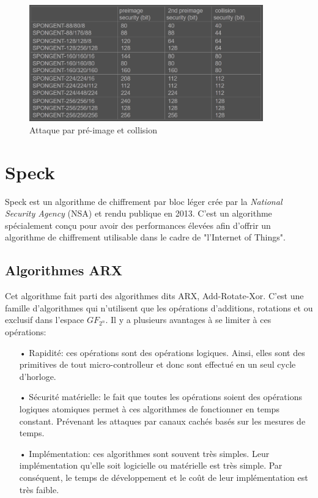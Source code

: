 		\begin{figure}[!h]
			\centering
			\includegraphics[width=0.9\textwidth, height=0.3\textheight]{imgs/Spongent/attaquePreImage.png}
			\caption{Attaque par pré-image et collision}
			\label{attaquePreImage}
		\end{figure}

		\section{Speck}

			Speck est un algorithme de chiffrement par bloc léger crée par la
		\textit{National Security Agency} (NSA) et rendu
		publique en 2013. C'est un algorithme spécialement conçu pour avoir des performances
		élevées afin d'offrir un algorithme de chiffrement utilisable dans le cadre de
		"l'Internet of Things".

		\subsection{Algorithmes ARX}

				Cet algorithme fait parti des algorithmes dits ARX, Add-Rotate-Xor. C'est une famille
			d'algorithmes qui n'utilisent que les opérations d'additions, rotations et ou exclusif
			dans l'espace $GF_{2^n}$. Il y a plusieurs avantages à se limiter à ces opérations:

			\begin{enumerate}
			\item[•] Rapidité: ces opérations sont des opérations logiques. Ainsi, elles sont
				des primitives de tout micro-controlleur et donc sont effectué en un seul
				cycle d'horloge.
			\item[•] Sécurité matérielle: le fait que toutes les opérations soient des opérations
				logiques atomiques permet à ces algorithmes de fonctionner en temps constant.
				Prévenant les attaques par canaux cachés basés sur les mesures de temps.
			\item[•] Implémentation: ces algorithmes sont souvent très simples. Leur implémentation
				qu'elle soit logicielle ou matérielle est très simple. Par conséquent, le
				temps de développement et le coût de leur implémentation est très faible.
			\end{enumerate}

